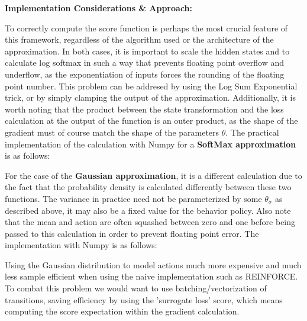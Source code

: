 \documentclass[11pt]{report}
\begin{document}
	\noindent\textbf{Implementation Considerations \& Approach:}
	\par
	To correctly compute the score function is perhaps the most crucial feature of this framework, regardless of the algorithm used or the architecture of the approximation. In both cases, it is important to scale the hidden states and to calculate log softmax in such a way that prevents floating point overflow and underflow, as the exponentiation of inputs forces the rounding of the floating point number. This problem can be addresed by using the Log Sum Exponential trick, or by simply clamping the output of the approximation. Additionally, it is worth noting that the product between the state transformation and the loss calculation at the output of the function is an outer product, as the shape of the gradient must of course match the shape of the parameters $\theta$.
\newpage
	The practical implementation of the calculation with Numpy for a \textbf{SoftMax approximation} is as follows:
	
	\par For the case of the \textbf{Gaussian approximation}, it is a different calculation due to the fact that the probability density is calculated differently between these two functions. The variance in practice need not be parameterized by some $\theta_\sigma$ as described above, it may also be a fixed value for the behavior policy. Also note that the mean and action are often squashed between zero and one before being passed to this calculation in order to prevent floating point error. The implementation with Numpy is as follows:
	
	Using the Gaussian distribution to model actions much more expensive and much less sample efficient when using the naive implementation such as REINFORCE. To combat this problem we would want to use batching/vectorization of transitions, saving efficiency by using the 'surrogate loss' score, which means computing the score expectation within the gradient calculation.
\newpage
\end{document}
